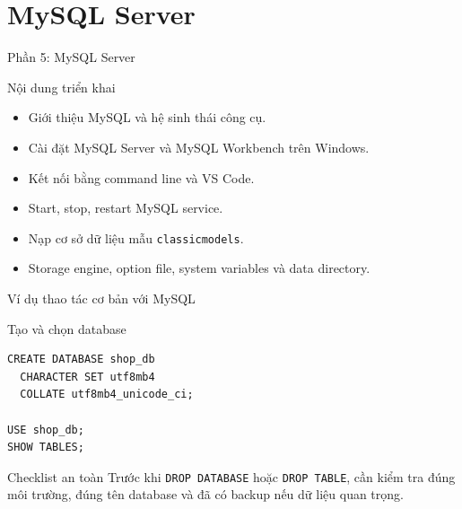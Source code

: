 \documentclass[aspectratio=169,11pt]{beamer}
\begin{document}
\section{MySQL Server}
\begin{frame}{Phần 5: MySQL Server}
\begin{block}{Nội dung triển khai}
\begin{itemize}
  \item Giới thiệu MySQL và hệ sinh thái công cụ.
  \item Cài đặt MySQL Server và MySQL Workbench trên Windows.
  \item Kết nối bằng command line và VS Code.
  \item Start, stop, restart MySQL service.
  \item Nạp cơ sở dữ liệu mẫu \texttt{classicmodels}.
  \item Storage engine, option file, system variables và data directory.
\end{itemize}
\end{block}
\end{frame}

\begin{frame}[fragile]{Ví dụ thao tác cơ bản với MySQL}
\begin{block}{Tạo và chọn database}
\begin{verbatim}
CREATE DATABASE shop_db
  CHARACTER SET utf8mb4
  COLLATE utf8mb4_unicode_ci;

USE shop_db;
SHOW TABLES;
\end{verbatim}
\end{block}

\begin{alertblock}{Checklist an toàn}
Trước khi \texttt{DROP DATABASE} hoặc \texttt{DROP TABLE}, cần kiểm tra đúng môi trường, đúng tên database và đã có backup nếu dữ liệu quan trọng.
\end{alertblock}
\end{frame}

\end{document}
